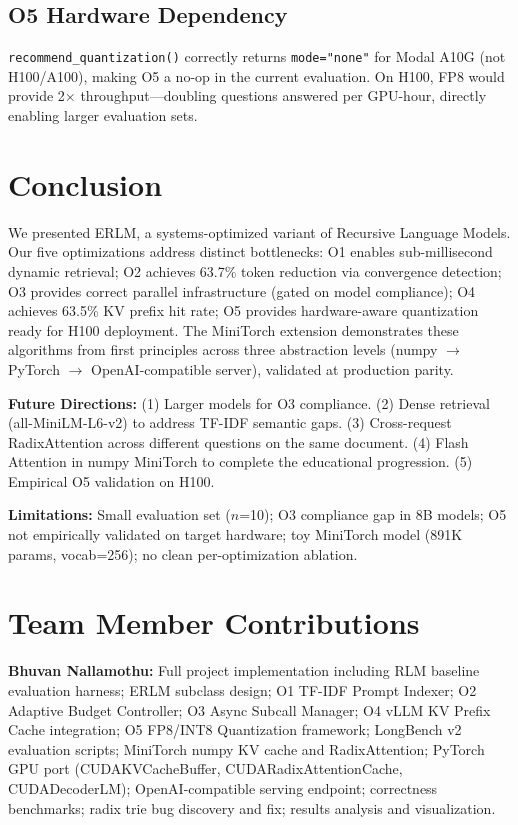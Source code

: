 \documentclass{article}
\begin{document}
\subsection{O5 Hardware Dependency}

\texttt{recommend\_quantization()} correctly returns \texttt{mode="none"} for Modal A10G (not H100/A100), making O5 a no-op in the current evaluation. On H100, FP8 would provide 2$\times$ throughput---doubling questions answered per GPU-hour, directly enabling larger evaluation sets.

\section{Conclusion}

We presented ERLM, a systems-optimized variant of Recursive Language Models. Our five optimizations address distinct bottlenecks: O1 enables sub-millisecond dynamic retrieval; O2 achieves 63.7\% token reduction via convergence detection; O3 provides correct parallel infrastructure (gated on model compliance); O4 achieves 63.5\% KV prefix hit rate; O5 provides hardware-aware quantization ready for H100 deployment. The MiniTorch extension demonstrates these algorithms from first principles across three abstraction levels (numpy $\to$ PyTorch $\to$ OpenAI-compatible server), validated at production parity.

\textbf{Future Directions:}
(1) Larger models for O3 compliance.
(2) Dense retrieval (all-MiniLM-L6-v2) to address TF-IDF semantic gaps.
(3) Cross-request RadixAttention across different questions on the same document.
(4) Flash Attention in numpy MiniTorch to complete the educational progression.
(5) Empirical O5 validation on H100.

\textbf{Limitations:} Small evaluation set ($n$=10); O3 compliance gap in 8B models; O5 not empirically validated on target hardware; toy MiniTorch model (891K params, vocab=256); no clean per-optimization ablation.

\section*{Team Member Contributions}

\textbf{Bhuvan Nallamothu:} Full project implementation including RLM baseline evaluation harness; ERLM subclass design; O1 TF-IDF Prompt Indexer; O2 Adaptive Budget Controller; O3 Async Subcall Manager; O4 vLLM KV Prefix Cache integration; O5 FP8/INT8 Quantization framework; LongBench v2 evaluation scripts; MiniTorch numpy KV cache and RadixAttention; PyTorch GPU port (CUDAKVCacheBuffer, CUDARadixAttentionCache, CUDADecoderLM); OpenAI-compatible serving endpoint; correctness benchmarks; radix trie bug discovery and fix; results analysis and visualization.
\end{document}
